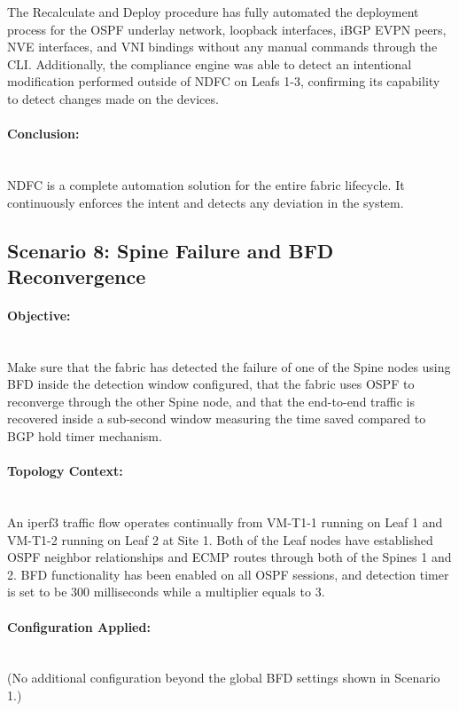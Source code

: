 The Recalculate and Deploy procedure has fully automated the deployment process for the OSPF underlay network, loopback interfaces, iBGP EVPN peers, NVE interfaces, and VNI bindings without any manual commands through the CLI. Additionally, the compliance engine was able to detect an intentional modification performed outside of NDFC on Leafs 1-3, confirming its capability to detect changes made on the devices.

\paragraph{Conclusion:}~\\
NDFC is a complete automation solution for the entire fabric lifecycle. It continuously enforces the intent and detects any deviation in the system.

\subsection{Scenario 8: Spine Failure and BFD Reconvergence}
\paragraph{Objective:}~\\
Make sure that the fabric has detected the failure of one of the Spine nodes using BFD inside the detection window configured, that the fabric uses OSPF to reconverge through the other Spine node, and that the end-to-end traffic is recovered inside a sub-second window measuring the time saved compared to BGP hold timer mechanism.

\paragraph{Topology Context:}~\\
An iperf3 traffic flow operates continually from VM-T1-1 running on Leaf 1 and VM-T1-2 running on Leaf 2 at Site 1. Both of the Leaf nodes have established OSPF neighbor relationships and ECMP routes through both of the Spines 1 and 2. BFD functionality has been enabled on all OSPF sessions, and detection timer is set to be 300 milliseconds while a multiplier equals to 3.

\paragraph{Configuration Applied:}~\\
(No additional configuration beyond the global BFD settings shown in Scenario 1.)

